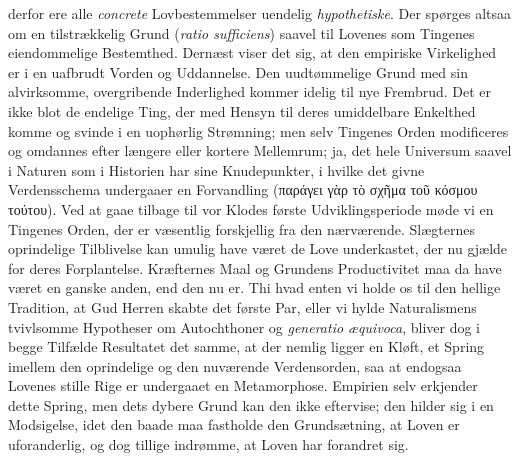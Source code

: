 \documentclass[12pt]{book}
\newcommand{\opage}[1]{\marginnote{\footnotesize\textit{[#1]}}}
\begin{document}
derfor ere alle \emph{concrete} Lovbestemmelser uendelig \emph{hypothetiske}. Der spørges
altsaa om en tilstrækkelig Grund (\textit{ratio sufficiens}) saavel til Lovenes som Tingenes
eiendommelige Bestemthed. Dernæst viser det sig, at den empiriske Virkelighed er i en
uafbrudt Vorden og Uddannelse. Den uudtømmelige Grund med sin alvirksomme, overgribende
Inderlighed kommer idelig til nye Frembrud. Det er ikke blot de endelige Ting, der med Hensyn
til deres umiddelbare Enkelthed komme og svinde i en uophørlig Strømning; men selv Tingenes
Orden modificeres og omdannes efter længere eller kortere Mellemrum; ja, det hele Universum
saavel i Naturen som i Historien har sine Knudepunkter, i
\opage{147} %
hvilke det givne Verdensschema undergaaer en Forvandling (παράγει γὰρ τὸ σχῆμα τοῦ κόσμου
τούτου). Ved at gaae tilbage til vor Klodes første Udviklingsperiode møde vi en Tingenes
Orden, der er væsentlig forskjellig fra den nærværende. Slægternes oprindelige Tilblivelse
kan umulig have været de Love underkastet, der nu gjælde for deres Forplantelse. Kræfternes
Maal og Grundens Productivitet maa da have været en ganske anden, end den nu er. Thi hvad
enten vi holde os til den hellige Tradition, at Gud Herren skabte det første Par, eller vi
hylde Naturalismens tvivlsomme Hypotheser om Autochthoner og \textit{generatio æquivoca},
bliver dog i begge Tilfælde Resultatet det samme, at der nemlig ligger en Kløft, et Spring
imellem den oprindelige og den nuværende Verdensorden, saa at endogsaa Lovenes stille Rige er
undergaaet en Metamorphose. Empirien selv erkjender dette Spring, men dets dybere Grund kan
den ikke eftervise; den hilder sig i en Modsigelse, idet den baade maa fastholde den
Grundsætning, at Loven er uforanderlig, og dog tillige indrømme, at Loven har forandret sig.
\end{document}

